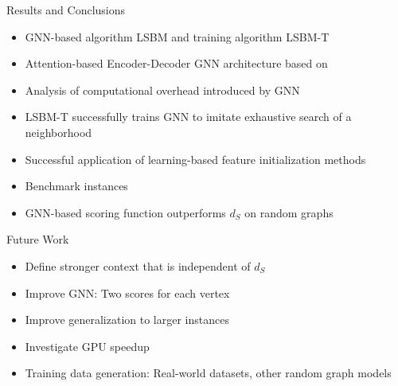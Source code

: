 \documentclass{beamer}
\newcommand{\backupbegin}{
   \newcounter{finalframe}
   \setcounter{finalframe}{\value{framenumber}}
}
\begin{document}
\begin{frame}{Results and Conclusions}
    \begin{itemize}
        \item<1-> GNN-based algorithm LSBM and training algorithm LSBM-T
        \item<2-> Attention-based Encoder-Decoder GNN architecture based on \cite{Kool2019}
        \item<3-> Analysis of computational overhead introduced by GNN
        \item<4-> LSBM-T successfully trains GNN to imitate exhaustive search of a neighborhood
        \item<5-> Successful application of learning-based feature initialization methods
        \item<6-> Benchmark instances
        \item<7-> GNN-based scoring function outperforms $d_S$ on random graphs
    \end{itemize}
\end{frame}

\begin{frame}{Future Work}
    \begin{itemize}
        \item Define stronger context that is independent of $d_S$
        \item Improve GNN: Two scores for each vertex
        \item Improve generalization to larger instances
        \item Investigate GPU speedup
        \item Training data generation: Real-world datasets, other random graph models
    \end{itemize}
\end{frame}

\backupbegin

 


\end{document}
